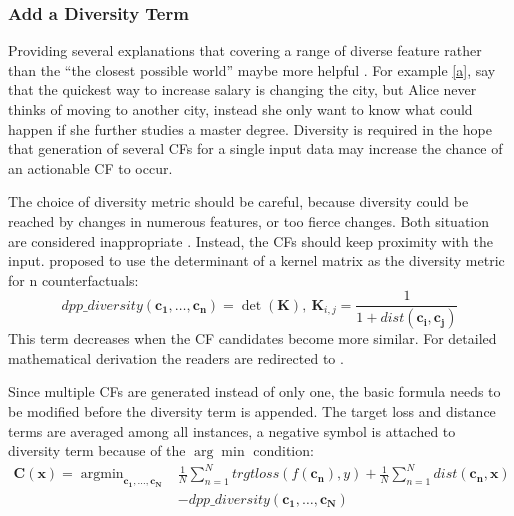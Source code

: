 \subsubsection{Add a Diversity Term}
Providing several explanations that covering a range of diverse feature rather than the ``the closest possible world'' maybe more helpful \cite{watcher2017}. For example \ref{a}, say that the quickest way to increase salary is changing the city, but Alice never thinks of moving to another city, instead she only want to know what could happen if she further studies a master degree. Diversity is required in the hope that generation of several CFs for a single input data may increase the chance of an actionable CF to occur.

The choice of diversity metric should be careful, because diversity could be reached by changes in numerous features, or too fierce changes. Both situation are considered inappropriate \cite{DiCE}. Instead, the CFs should keep proximity with the input. \citeauthor{DiCE} \cite{DiCE} proposed to use the determinant of a kernel matrix as the diversity metric for n counterfactuals:
\begin{equation}\label{eq:dpp}
  dpp\_diversity(\mathbf{c_1,\dots,c_n})=\det(\mathbf{K}),\ \mathbf{K}_{i,j}=\frac{1}{1+dist(\mathbf{c_i,c_j})}
\end{equation}
%
This term decreases when the CF candidates become more similar. For detailed mathematical derivation the readers are redirected to \cite[second chapter]{kulesza2011dpp}.

Since multiple CFs are generated instead of only one, the basic formula needs to be modified before the diversity term is appended. The target loss and distance terms are averaged among all instances, a negative symbol is attached to diversity term because of the $\arg\min$ condition:
\begin{equation}\label{eq:DiCe}
\begin{split}
  \mathbf{C(x)}=\mathop{\arg\min}_{\mathbf{c_1,\dots,c_N}}&\frac{1}{N}\sum_{n=1}^{N}trgtloss(f(\mathbf{c_n}),y)
  +\frac{1}{N}\sum_{n=1}^{N}dist(\mathbf{c_n,x})
  \\&-dpp\_diversity(\mathbf{c_1,\dots,c_N})
\end{split}
\end{equation}

